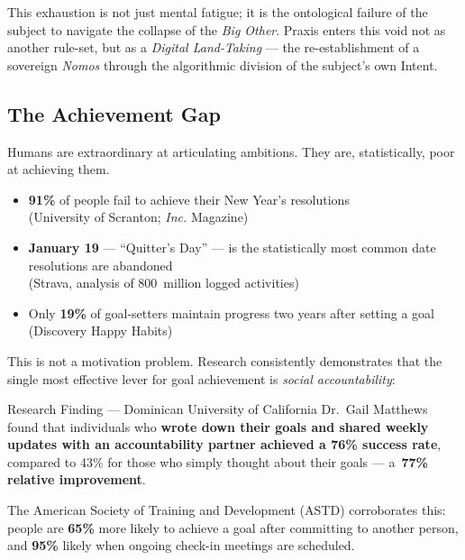 \documentclass[11pt,a4paper]{article}
\begin{document}
This exhaustion is not just mental fatigue; it is the ontological failure of the subject to navigate the collapse of the \textit{Big Other}. Praxis enters this void not as another rule-set, but as a \textit{Digital Land-Taking} — the re-establishment of a sovereign \textit{Nomos} through the algorithmic division of the subject's own Intent.

\subsection{The Achievement Gap}

Humans are extraordinary at articulating ambitions. They are, statistically, poor at achieving them.

\begin{statbox}
\begin{itemize}[nosep]
  \item \textbf{91\%} of people fail to achieve their New Year's resolutions \\ {\small (University of Scranton; \textit{Inc.} Magazine)}
  \item \textbf{January 19} — ``Quitter's Day'' — is the statistically most common date resolutions are abandoned \\ {\small (Strava, analysis of 800~million logged activities)}
  \item Only \textbf{19\%} of goal-setters maintain progress two years after setting a goal \\ {\small (Discovery Happy Habits)}
\end{itemize}
\end{statbox}

This is not a motivation problem. Research consistently demonstrates that the single most effective lever for goal achievement is \textit{social accountability}:

\begin{calloutbox}{Research Finding — Dominican University of California}
Dr.~Gail Matthews found that individuals who \textbf{wrote down their goals and shared weekly updates with an accountability partner achieved a 76\% success rate}, compared to 43\% for those who simply thought about their goals — a~\textbf{77\% relative improvement}.

The American Society of Training and Development (ASTD) corroborates this: people are \textbf{65\%} more likely to achieve a goal after committing to another person, and \textbf{95\%} likely when ongoing check-in meetings are scheduled.
\end{calloutbox}
\end{document}
